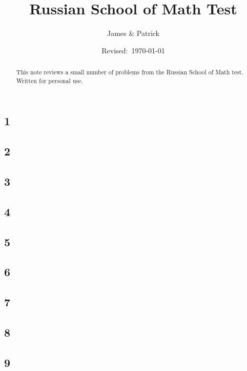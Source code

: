 \documentclass[12pt]{article}
\title{Russian School of Math Test}
\author{James \& Patrick}
\date{Revised:~\today}
\begin{document}
\maketitle
\begin{abstract}\setlength{\parindent}{0pt}%
This note reviews a small number of problems from the Russian School of Math test. Written for personal use.
\end{abstract}

\thispagestyle{empty}
\clearpage

\subsection*{1}


\subsection*{2}


\subsection*{3}


\subsection*{4}


\subsection*{5}


\subsection*{6}


\subsection*{7}


\subsection*{8}


\subsection*{9}

\end{document}
